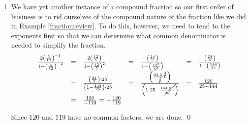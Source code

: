 \documentclass{ximera}
\begin{document}
\begin{example}
\begin{enumerate}
\[\begin{array}{rclclcl}
\frac{\left(\frac{5\cdot 3^{51}}{4^{36}}\right)}{\left(\frac{5 \cdot 3^{49}}{4^{34}}\right)} & = & \frac{5\cdot 3^{51}}{4^{36}} \cdot \frac{4^{34}}{5 \cdot 3^{49}} & = & \frac{\cancel{5} \cdot 3^{51} \cdot 4^{34}}{\cancel{5} \cdot 3^{49} \cdot 4^{36}} & = & \frac{3^{51}}{3^{49}} \cdot\frac{4^{34}}{4^{36}} \\

& = & 3^{51-49} \cdot 4^{34-36} & = & 3^{2} \cdot 4^{-2} & = & 3^{2} \cdot \left( \frac{1}{4^2}\right) \\

& = & 9 \cdot \left(\frac{1}{16} \right) & = & \frac{9}{16} & & \\ \end{array} \]

\item We have yet another instance of a compound fraction so our first order of business is to rid ourselves of the compound nature of the fraction like we did in Example \ref{fractionreview}.  To do this, however, we need to tend to the exponents first so that we can determine what common denominator is needed to simplify the fraction.\[ \begin{array}{rclclcl} \frac{2 \left(\frac{5}{12}\right)^{-1}}{1 - \left(\frac{5}{12}\right)^{-2}} & = & \frac{2 \left(\frac{12}{5}\right)}{1 - \left(\frac{12}{5}\right)^{2}} & = & \frac{\left(\frac{24}{5}\right)}{1 - \left(\frac{12^2}{5^2}\right)} & = & \frac{\left(\frac{24}{5}\right)}{1 - \left(\frac{144}{25}\right)} \\  

& = & \frac{\left(\frac{24}{5}\right) \cdot 25}{\left(1 - \frac{144}{25}\right)\cdot 25} & = & \frac{\left(\frac{24\cdot 5 \cdot \cancel{5}}{\cancel{5}}\right)}{\left(1 \cdot 25 - \frac{144 \cdot \cancel{25}}{\cancel{25}}\right)} & = & \frac{120}{25-144} \\  
& = & \frac{120}{-119} = -\frac{120}{119} & & & & \\  \end{array} \]

Since $120$ and $119$ have no common factors, we are done.  \qed

\end{enumerate}

\end{example}

\medskip
\end{document}

